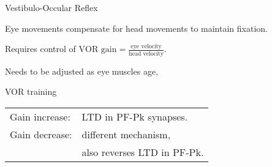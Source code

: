 \documentclass{beamer}%
\begin{document}
\begin{frame}{Vestibulo-Occular Reflex}
%
 \parbox[t]{0.4\linewidth}{}
 \parbox[t]{0.59\linewidth}{%
 Eye movements compensate for head movements to maintain fixation.

 \vp Requires control of $\text{VOR gain} = \frac{\text{eye velocity}}{\text{head velocity}}$.

 \vp Needs to be adjusted as eye muscles age, \etc
 }

%
\end{frame}



\begin{frame}{VOR training}
%
 \parbox[t]{0.2\linewidth}{%
   
   \vp{}
   }
 \hspace{0.15\linewidth}
 \parbox[t]{0.59\linewidth}{%

   \vp \begin{tabular}{ll}
   Gain increase: & LTD in PF-Pk synapses.\\
   Gain decrease: & different mechanism,\\
    & also reverses LTD in PF-Pk.
   \end{tabular}
 }

%
\end{frame}

%
%
\end{document}
